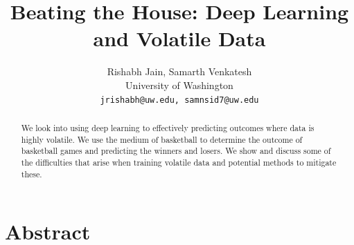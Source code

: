 \documentclass[10pt,twocolumn,letterpaper]{article}
\begin{document}
\title{Beating the House: Deep Learning and Volatile Data}

\author{Rishabh Jain, Samarth Venkatesh\\
University of Washington\\
{\tt\small jrishabh@uw.edu, samnsid7@uw.edu}
}
\maketitle




\maketitle



\section{Abstract}

\begin{abstract}

    We look into using deep learning to effectively predicting outcomes where data is highly volatile. We use the medium of basketball to determine the outcome of basketball games and predicting the winners and losers. We show and discuss some of the difficulties that arise when training volatile data and potential methods to mitigate these.
\end{abstract}
\end{document}
